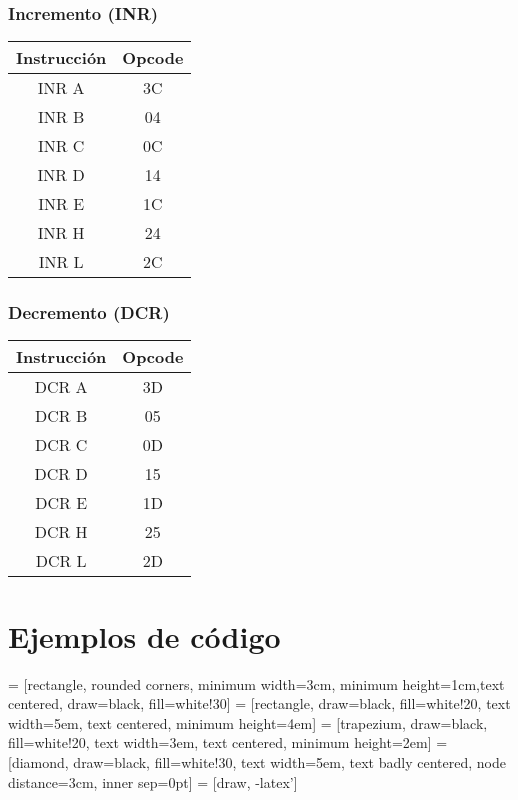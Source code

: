 \documentclass[12pt]{article}
\begin{document}
			\subsubsection{Incremento (INR)}
			
				\begin{table}[H]
					\centering
					\begin{tabular}{c|c}
						Instrucción & Opcode \\
						\midrule
						INR A & 3C \\
						INR B & 04 \\
						INR C & 0C \\
						INR D & 14 \\
						INR E & 1C \\
						INR H & 24 \\
						INR L & 2C \\
					\end{tabular}
				\end{table}
				
			\subsubsection{Decremento (DCR)}
			
				\begin{table}[H]
					\centering
					\begin{tabular}{c|c}
						Instrucción & Opcode \\
						\midrule
						DCR A & 3D \\
						DCR B & 05 \\
						DCR C & 0D \\
						DCR D & 15 \\
						DCR E & 1D \\
						DCR H & 25 \\
						DCR L & 2D \\
					\end{tabular}
				\end{table}
				
	\newpage
	
	\section{Ejemplos de código}
	
		 = [rectangle, rounded corners, minimum width=3cm, minimum height=1cm,text centered, draw=black, fill=white!30]
		 = [rectangle, draw=black, fill=white!20, text width=5em, text centered, minimum height=4em]
		 = [trapezium, draw=black, fill=white!20, text width=3em, text centered, minimum height=2em]
		 = [diamond, draw=black, fill=white!30, text width=5em, text badly centered, node distance=3cm, inner sep=0pt]
		 = [draw, -latex']
	
\end{document}
